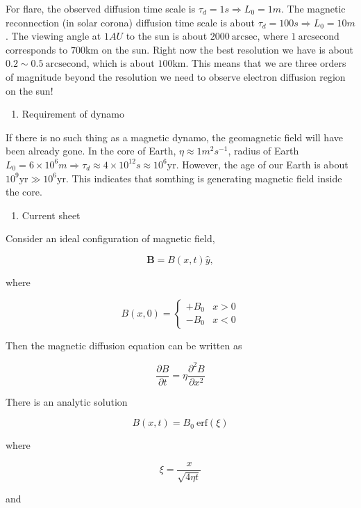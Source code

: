 \documentclass[
  notoc %
]{tufte-book}
\providecommand{\tightlist}{%
  \setlength{\itemsep}{0pt}\setlength{\parskip}{0pt}
}
\begin{document}
For flare, the observed diffusion time scale is
\(\tau_d=1s\Rightarrow L_0=1m\). The magnetic reconnection (in solar
corona) diffusion time scale is about
\(\tau_d=100s\Rightarrow L_0=10m\). The viewing angle at \(1AU\) to the
sun is about \(2000\ \text{arcsec}\), where \(1\ \text{arcsecond}\)
corresponds to \(700\text{km}\) on the sun. Right now the best
resolution we have is about \(0.2\sim0.5\ \text{arcsecond}\), which is
about \(100\text{km}\). This means that we are three orders of magnitude
beyond the resolution we need to observe electron diffusion region on
the sun!

\begin{enumerate}
\def\labelenumi{\arabic{enumi}.}
\setcounter{enumi}{1}
\tightlist
\item
  Requirement of dynamo
\end{enumerate}

If there is no such thing as a magnetic dynamo, the geomagnetic field
will have been already gone. In the core of Earth,
\(\eta\approx 1m^2s^{-1}\), radius of Earth
\(L_0=6\times10^6m\Rightarrow \tau_d\approx 4\times10^{12}s\approx10^6\text{yr}\).
However, the age of our Earth is about
\(10^9\text{yr}\gg 10^6\text{yr}\). This indicates that somthing is
generating magnetic field inside the core.

\begin{enumerate}
\def\labelenumi{\arabic{enumi}.}
\setcounter{enumi}{2}
\tightlist
\item
  Current sheet
\end{enumerate}

Consider an ideal configuration of magnetic field,

\[
\mathbf{B}=B(x,t)\widehat{y},
\]

where

\[
B(x,0)=\left\{
\begin{array}{lr}
+B_0 & x>0 \\ -B_0 & x<0
\end{array}
\right.
\]

Then the magnetic diffusion equation can be written as

\[
\frac{\partial B}{\partial t}=\eta \frac{\partial^2 B}{\partial x^2}
\]

There is an analytic solution

\[
B(x,t)=B_0\ \text{erf}(\xi)
\]

where

\[
\xi=\frac{x}{\sqrt{4\eta t}}
\]

and
\end{document}
